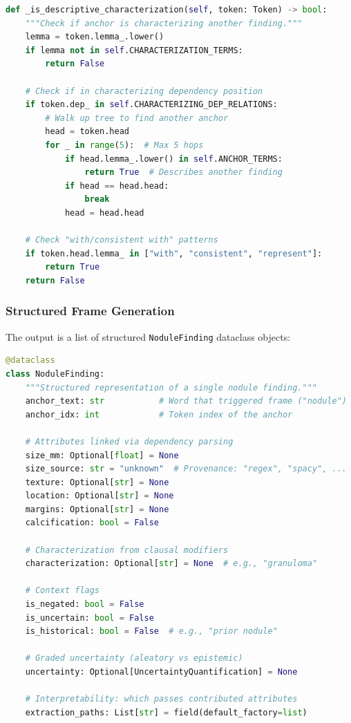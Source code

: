 \documentclass[12pt]{article}
\begin{document}
\begin{lstlisting}[language=Python, caption={Characterization term disambiguation.}]
def _is_descriptive_characterization(self, token: Token) -> bool:
    """Check if anchor is characterizing another finding."""
    lemma = token.lemma_.lower()
    if lemma not in self.CHARACTERIZATION_TERMS:
        return False
    
    # Check if in characterizing dependency position
    if token.dep_ in self.CHARACTERIZING_DEP_RELATIONS:
        # Walk up tree to find another anchor
        head = token.head
        for _ in range(5):  # Max 5 hops
            if head.lemma_.lower() in self.ANCHOR_TERMS:
                return True  # Describes another finding
            if head == head.head:
                break
            head = head.head
    
    # Check "with/consistent with" patterns
    if token.head.lemma_ in ["with", "consistent", "represent"]:
        return True
    return False
\end{lstlisting}

\subsubsection{Structured Frame Generation}

The output is a list of structured \texttt{NoduleFinding} dataclass objects:

\begin{lstlisting}[language=Python, caption={NoduleFinding dataclass definition.}]
@dataclass
class NoduleFinding:
    """Structured representation of a single nodule finding."""
    anchor_text: str           # Word that triggered frame ("nodule")
    anchor_idx: int            # Token index of the anchor
    
    # Attributes linked via dependency parsing
    size_mm: Optional[float] = None
    size_source: str = "unknown"  # Provenance: "regex", "spacy", ...
    texture: Optional[str] = None
    location: Optional[str] = None
    margins: Optional[str] = None
    calcification: bool = False
    
    # Characterization from clausal modifiers
    characterization: Optional[str] = None  # e.g., "granuloma"
    
    # Context flags
    is_negated: bool = False
    is_uncertain: bool = False
    is_historical: bool = False  # e.g., "prior nodule"
    
    # Graded uncertainty (aleatory vs epistemic)
    uncertainty: Optional[UncertaintyQuantification] = None
    
    # Interpretability: which passes contributed attributes
    extraction_paths: List[str] = field(default_factory=list)
\end{lstlisting}
\end{document}
